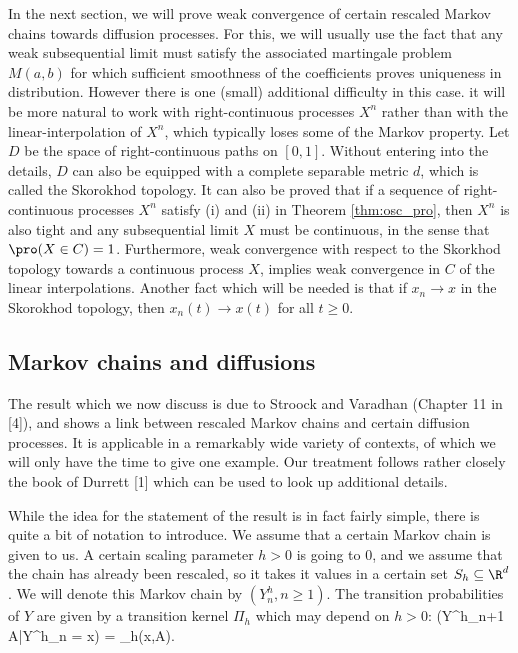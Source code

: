In the next section, we will prove weak convergence of certain rescaled Markov chains towards diffusion processes. For this, we will usually use the fact that any weak subsequential limit must satisfy the associated martingale problem $M(a, b)$ for which sufficient smoothness of the coefficients proves uniqueness in distribution. However there is one (small) additional difficulty in this case. it will be more natural to work with right-continuous processes $X^n$ rather than with the linear-interpolation of $X^n$, which typically loses some of the Markov property. Let $D$ be the space of right-continuous paths on $[0, 1]$. Without entering into the details, $D$ can also be equipped with a complete separable metric $d$, which is called the Skorokhod topology. It can also be proved that if a sequence of right-continuous processes $X^n$ satisfy (i) and (ii) in Theorem \ref{thm:osc_pro}, then $X^n$ is also tight and any subsequential limit $X$ must be continuous, in the sense that $\pro(X \in C) = 1$. Furthermore, weak convergence with respect to the Skorkhod topology towards a continuous process $X$, implies weak convergence in $C$ of the linear interpolations. Another fact which will be needed is that if $x_n \to x$ in the Skorokhod topology, then $x_n(t) \to x(t)$ for all $t \geq 0$.

\subsection{Markov chains and diffusions}

The result which we now discuss is due to Stroock and Varadhan (Chapter 11 in [4]), and shows a link between rescaled Markov chains and certain diffusion processes. It is applicable in a remarkably wide variety of contexts, of which we will only have the time to give one example. Our treatment follows rather closely the book of Durrett [1] which can be used to look up additional details.

While the idea for the statement of the result is in fact fairly simple, there is quite a bit of notation to introduce. We assume that a certain Markov chain is given to us. A certain scaling parameter $h > 0$ is going to 0, and we assume that the chain has already been rescaled, so it takes it values in a certain set $S_h \subseteq\R^d$. We will denote this Markov chain by $(Y^h_n , n \geq 1)$. The transition probabilities of $Y$ are given by a transition kernel $\Pi_h$ which may depend on $h > 0$:
\be
\pro(Y^h_{n+1} \in A|Y^h_n = x) = \Pi_h(x,A).
\ee

